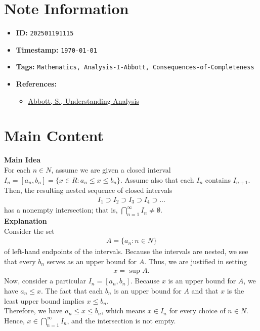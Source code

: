 \clearpage
{}
\label{202501191115}
\renewcommand{\notetitle}{Nested Interval Property}

\section*{Note Information}
\begin{itemize}
  \item \textbf{ID:} \texttt{202501191115}
  \item \textbf{Timestamp:} \texttt{\today \ \currenttime}
  \item \textbf{Tags:} \texttt{Mathematics, Analysis-I-Abbott, Consequences-of-Completeness}
  \item \textbf{References:}
    \begin{itemize}
      \item \href{/home/garrett/Personal/References/Mathematics/Analysis-I/Abbott.pdf}{Abbott, S., Understanding Analysis}
    \end{itemize}
\end{itemize}


\section*{Main Content}
\textbf{Main Idea}\\
For each $n \in N$, assume we are given a closed interval $I_n= [a_n, b_n] = \{ x \in R : a_n \leq x \leq b_n \}$. Assume also that each $I_n$ contains $I_{n+1}$. Then, the resulting nested sequence of closed intervals
\begin{align*}
  I_1 \supset I_2 \supset I_3 \supset I_4 \supset ...
\end{align*}
has a nonempty intersection; that is, $\bigcap_{n=1}^\infty I_n \neq \emptyset$.\\

\textbf{Explanation}\\
Consider the set 
\begin{align*}
  A = \{ a_n : n \in N \}
\end{align*}
of left-hand endpoints of the intervals. Because the intervals are nested, we see that every $b_n$ serves as an upper bound for $A$. Thus, we are justified in setting
\begin{align*}
  x = \text{ sup } A.
\end{align*}
Now, consider a particular $I_n = [a_n , b_n ]$. Because $x$ is an upper bound for $A$, we have $a_n \leq x$. The fact that each $b_n$ is an upper bound for $A$ and that $x$ is the least upper bound implies $x \leq b_n$.\\
Therefore, we have $a_n \leq x \leq b_n$, which means $x \in I_n$ for every choice of $n \in N$. Hence, $x \in \bigcap_{n=1}^\infty I_n$, and the intersection is not empty.\\


